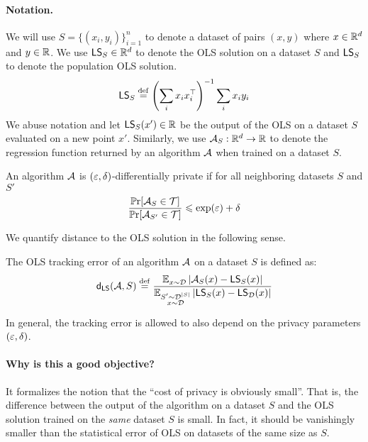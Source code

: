 \paragraph{Notation.} We will use $S = \{(x_i,y_i) \}_{i=1}^n$ to denote a dataset of pairs $(x,y)$ where $x \in \mathbb{R}^d$ and $y \in \mathbb{R}$. We use $\mathsf{LS}_S \in \mathbb{R}^d$ to denote the OLS solution on a dataset $S$ and $\mathsf{LS}_S$ to denote the population OLS solution.
\begin{align*}
	\mathsf{LS}_S \stackrel{\small \mathrm{def}}{=} \left(\sum_i x_i x_i^\top\right )^{-1} \sum_{i} x_i y_i
\end{align*}
We abuse notation and let $\mathsf{LS}_S(x') \in \mathbb{R}$ be the output of the OLS  on a dataset $S$ evaluated on a new point $x'$. Similarly, we use ${\cal A}_S: \mathbb{R}^d \rightarrow \mathbb{R}$ to denote the regression function returned by an algorithm ${\cal A}$ when trained on a dataset $S$.

\begin{definition}
An algorithm ${\cal A}$ is $(\varepsilon, \delta)$-differentially private if for all neighboring datasets $S$ and $S'$
\begin{align*}
	\frac{\operatorname*{\mathbb{P} r}[{\cal A}_S \in {\cal T}]}{\operatorname*{\mathbb{P} r}[{\cal A}_{S'}\in {\cal T}]} \leqslant \exp(\varepsilon) + \delta
\end{align*}
\end{definition}

We quantify distance to the OLS solution in the following sense. 
\begin{definition}
The OLS tracking error  of an algorithm ${\cal A}$ on a dataset $S$ is defined as:
\begin{align*}
\mathsf{d}_{\mathsf{LS}}({\cal A}, S) \stackrel{\small \mathrm{def}}{=} \frac{\operatorname*{\mathbb{E}}_{\substack{x \sim {\cal D}}} |{\cal A}_S(x) - \mathsf{LS}_S(x)|}{\operatorname*{\mathbb{E}}_{\substack{S' \sim \mathcal D^{|S|} \\ x \sim {\cal D}}} |\mathsf{LS}_S(x) - \mathsf{LS}_{\cal D}(x)|}
\end{align*}
\end{definition}
In general, the tracking error is allowed to also depend on the privacy parameters $(\varepsilon, \delta)$. \\


\paragraph{Why is this a good objective?} 

It formalizes the notion that the ``cost of privacy is obviously small''. That is, the difference between the output of the algorithm on a dataset $S$ and the OLS solution trained on the \emph{same} dataset $S$ is small. In fact, it should be vanishingly smaller than the statistical error of OLS on datasets of the same size as $S$.

